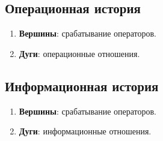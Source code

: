 \subsection*{Операционная история}
\begin{enumerate}
    \item \textbf{Вершины}: срабатывание операторов.
    \item \textbf{Дуги}: операционные отношения.
\end{enumerate}

\subsection*{Информационная история}
\begin{enumerate}
    \item \textbf{Вершины}: срабатывание операторов.
    \item \textbf{Дуги}: информационные отношения.
\end{enumerate}